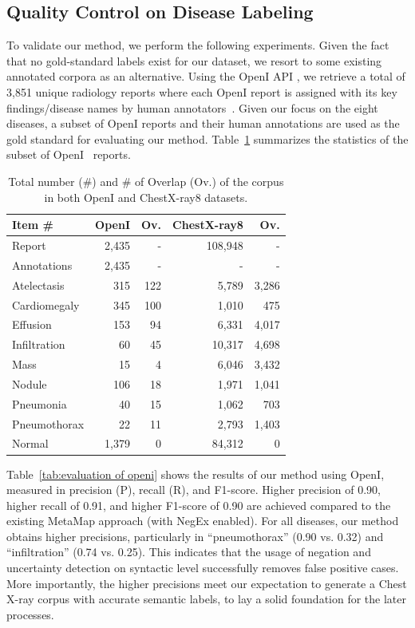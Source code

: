 \documentclass[10pt,twocolumn,letterpaper]{article}
\begin{document}
\subsection{Quality Control on Disease Labeling}

To validate our method, we perform the following experiments. Given the fact that no gold-standard labels exist for our dataset, we resort to some existing annotated corpora as an alternative. Using the OpenI API %
\cite{openi}, we retrieve a total of 3,851 unique radiology reports where each OpenI report is assigned with its key findings/disease names by human annotators~\cite{demner2015preparing}. Given our focus on the eight diseases, a subset of OpenI reports and their human annotations are used as the gold standard for evaluating our method. Table~\ref{tab:openi_corpus} summarizes the statistics of the subset of OpenI~\cite{openi,QIMS5132} reports. 
%
\begin{table}
	\begin{center}
		\begin{tabular}{l|r|r|r|r}
			\hline
			Item \# & OpenI & Ov. & ChestX-ray8 & Ov.\\
			\hline\hline
			Report & 2,435 & - & 108,948 & -\\
			Annotations & 2,435 & - & - & -\\
			Atelectasis & 315 & 122 & 5,789 & 3,286 \\
			Cardiomegaly & 345 & 100 & 1,010 & 475\\
			Effusion & 153 & 94 & 6,331 & 4,017\\
			Infiltration & 60 & 45 & 10,317 & 4,698\\
			Mass & 15 & 4 & 6,046 & 3,432\\
			Nodule & 106 & 18 & 1,971 & 1,041 \\
			Pneumonia & 40 & 15 & 1,062 & 703\\
			Pneumothorax & 22 & 11 & 2,793 & 1,403\\
			Normal & 1,379 & 0 & 84,312 & 0\\
			\hline
		\end{tabular}
	\end{center}
	\caption{Total number (\#) and \# of Overlap (Ov.) of the corpus in both OpenI and ChestX-ray8 datasets.}
	\label{tab:openi_corpus}
\end{table}
Table~\ref{tab:evaluation of openi} shows the results of our method using OpenI, measured in precision (P), recall (R), and F1-score. Higher precision of 0.90, higher recall of 0.91, and higher F1-score of 0.90 are achieved compared to the existing MetaMap approach (with NegEx enabled). For all diseases, our method obtains higher precisions, particularly in ``pneumothorax'' (0.90 vs. 0.32) and ``infiltration'' (0.74 vs. 0.25). This indicates that the usage of negation and uncertainty detection on syntactic level successfully removes false positive cases. More importantly, the higher precisions meet our expectation to generate a Chest X-ray corpus with accurate semantic labels, to lay a solid foundation for the later processes. \vspace{-3mm}
\end{document}
